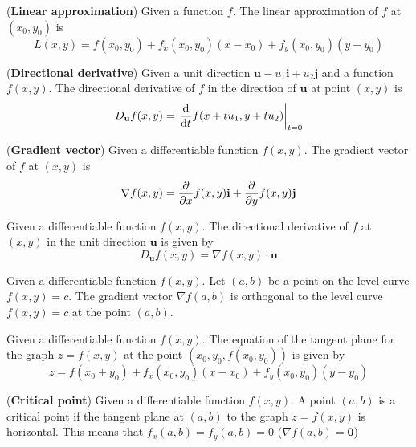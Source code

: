 \documentclass{huhtakm-template-book}
\begin{document}
\begin{defn}(\textbf{Linear approximation})
    Given a function $f$. The linear approximation of $f$ at $(x_{0},y_{0})$ is
    \begin{equation*}
        L(x,y)=f(x_{0},y_{0})+f_{x}(x_{0},y_{0})(x-x_{0})+f_{y}(x_{0},y_{0})(y-y_{0})
    \end{equation*}
\end{defn}
\begin{defn}(\textbf{Directional derivative})
    Given a unit direction $\mathbf{u}-u_{1}\mathbf{i}+u_{2}\mathbf{j}$ and a function $f(x,y)$. The directional derivative of $f$ in the direction of $\mathbf{u}$ at point $(x,y)$ is
    \begin{equation*}
        D_{\mathbf{u}}f(x,y)=\left.\odv{}{t}f(x+tu_{1},y+tu_{2})\right|_{t=0}
    \end{equation*}
\end{defn}
\begin{defn}(\textbf{Gradient vector})
    Given a differentiable function $f(x,y)$. The gradient vector of $f$ at $(x,y)$ is
    \begin{equation*}
        \nabla f(x,y)=\pdv*{f(x,y)}{x}\mathbf{i}+\pdv*{f(x,y)}{y}\mathbf{j}
    \end{equation*}
\end{defn}
\begin{thm}
    Given a differentiable function $f(x,y)$. The directional derivative of $f$ at $(x,y)$ in the unit direction $\mathbf{u}$ is given by
    \begin{equation*}
        D_{\mathbf{u}}f(x,y)=\nabla f(x,y)\cdot\mathbf{u}
    \end{equation*}
\end{thm}
\begin{thm}
    Given a differentiable function $f(x,y)$. Let $(a,b)$ be a point on the level curve $f(x,y)=c$. The gradient vector $\nabla f(a,b)$ is orthogonal to the level curve $f(x,y)=c$ at the point $(a,b)$.
\end{thm}
\begin{thm}
    Given a differentiable function $f(x,y)$. The equation of the tangent plane for the graph $z=f(x,y)$ at the point $(x_{0},y_{0},f(x_{0},y_{0}))$ is given by
    \begin{equation*}
        z=f(x_{0}+y_{0})+f_{x}(x_{0},y_{0})(x-x_{0})+f_{y}(x_{0},y_{0})(y-y_{0})
    \end{equation*}
\end{thm}
\begin{defn}(\textbf{Critical point})
    Given a differentiable function $f(x,y)$. A point $(a,b)$ is a critical point if the tangent plane at $(a,b)$ to the graph $z=f(x,y)$ is horizontal. This means that $f_{x}(a,b)=f_{y}(a,b)=0$ ($\nabla f(a,b)=\mathbf{0}$)
\end{defn}
\end{document}
